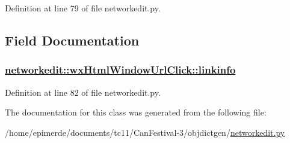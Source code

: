 Definition at line 79 of file networkedit.py.

\subsection{Field Documentation}
\hypertarget{classnetworkedit_1_1wxHtmlWindowUrlClick_8c1f6a4da431940a09972f01c45d015a}{
\subsubsection[linkinfo]{\setlength{\rightskip}{0pt plus 5cm}\hyperlink{classnetworkedit_1_1wxHtmlWindowUrlClick_8c1f6a4da431940a09972f01c45d015a}{networkedit::wx\-Html\-Window\-Url\-Click::linkinfo}}}
\label{classnetworkedit_1_1wxHtmlWindowUrlClick_8c1f6a4da431940a09972f01c45d015a}




Definition at line 82 of file networkedit.py.

The documentation for this class was generated from the following file:\begin{CompactItemize}
\item 
/home/epimerde/documents/tc11/Can\-Festival-3/objdictgen/\hyperlink{networkedit_8py}{networkedit.py}\end{CompactItemize}
